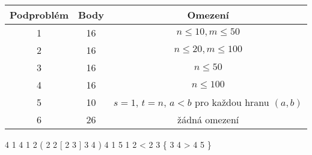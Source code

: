 
\begin{tabular}{|c|c|c|}
	\hline
	Podproblém & Body  & Omezení \\
	\hline
	1 & 16 & $n \leq 10, m\leq 50$ \\
	\hline
	2 & 16 & $n \leq 20, m\leq 100$\\
	\hline
	3 & 16 & $n \leq 50$\\
	\hline
	4 & 16 & $n \leq 100$ \\
	\hline
	5  & 10 & $s = 1$, $t = n$, $a < b$ pro každou hranu $(a,b)$\\
	\hline
	6 & 26  & žádná omezení \\
	\hline
\end{tabular}



 4 1 4
1 2 (
2 2 [
2 3 ]
3 4 )
\sampleEND
{} 4 1 5
1 2 <
2 3 \{
3 4 >
4 5 \}

\sampleEND




